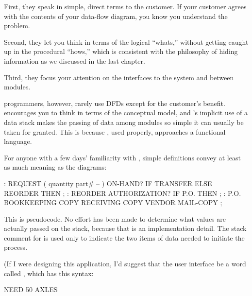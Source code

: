 First, they speak in simple, direct terms to the customer. If your
customer agrees with the contents of your data-flow diagram, you know
you understand the problem.

Second, they let you think in terms of the logical ``whats,'' without
getting caught up in the procedural ``hows,'' which is consistent with
the philosophy of hiding information as we discussed in the last chapter.

Third, they focus your attention on the interfaces to the system and
between modules.

\Forth{} programmers, however, rarely use DFDs except for the customer's
benefit. \Forth{} encourages you to think in terms of the conceptual
model, and \Forth{}'s implicit use of a data stack makes the passing of
data among modules so simple it can usually be taken for granted.
This is because \Forth{}, used properly, approaches a functional language.%
%
%

For anyone with a few days' familiarity with \Forth{}, simple definitions
convey at least as much meaning as the diagrams:
\begin{Code}
: REQUEST  ( quantity part# -- )
   ON-HAND?  IF  TRANSFER  ELSE  REORDER  THEN ;
: REORDER   AUTHORIZATION?  IF  P.O.  THEN ;
: P.O.   BOOKKEEPING COPY   RECEIVING COPY
   VENDOR MAIL-COPY ;
\end{Code}
This is \Forth{} pseudocode. No effort has been made to determine what
values are actually passed on the stack, because that is an
implementation detail. The stack comment for  is used
only to indicate the two items of data needed to initiate the process.

(If I were designing this application, I'd suggest that the user
interface be a word called , which has this syntax:

\begin{Code}
NEED 50 AXLES
\end{Code}

